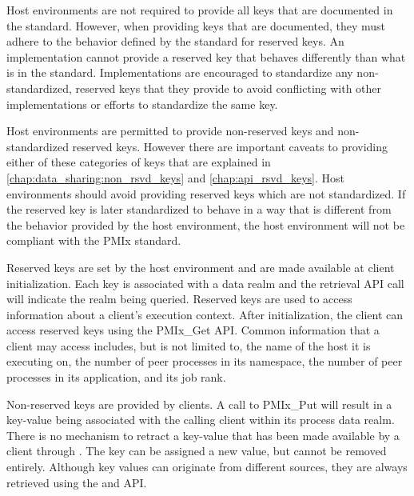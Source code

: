 Host environments are not required to provide all keys that are documented in the standard.  
However, when providing keys that are documented, they must adhere to the behavior defined by the standard for reserved keys.  
An implementation cannot provide a reserved key that behaves differently than what is in the standard.  
Implementations are encouraged to standardize any non-standardized, reserved keys that they provide to avoid conflicting with other implementations or efforts to standardize the same key.

Host environments are permitted to provide non-reserved keys and non-standardized reserved keys.  
However there are important caveats to providing either of these categories of keys 
that are explained in \ref{chap:data_sharing:non_rsvd_keys} and \ref{chap:api_rsvd_keys}.
Host environments should avoid providing reserved keys which are not standardized.  
If the reserved key is later standardized to behave in a way that is different from the behavior 
provided by the host environment, the host environment will not be compliant with the PMIx standard.
 
Reserved keys are set by the host environment and are made available at client initialization. 
Each key is associated with a data realm and the retrieval API call will indicate the realm being queried.
Reserved keys are used to access information about a client's execution context.
After initialization, the client can access reserved keys using the PMIx_Get API.  
Common information that a client may access includes, but is not limited to,
the name of the host it is executing on, 
the number of peer processes in its namespace,
the number of peer processes in its application,
and its job rank.


Non-reserved keys are provided by clients.
A call to PMIx_Put will result in a key-value being associated with the calling client within 
its process data realm.
There is no mechanism to retract a key-value that has been made available by a client through .
The key can be assigned a new value, but cannot be removed entirely.
Although key values can originate from different sources, they are always retrieved using the
 and  API.


